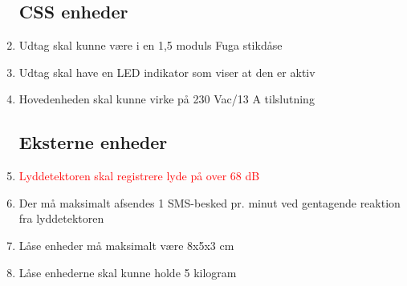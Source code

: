 \begin{enumerate}
	\subsection*{CSS enheder}
	\item Udtag skal kunne være i en 1,5 moduls Fuga stikdåse
	\item Udtag skal have en LED indikator som viser at den er aktiv
	\item Hovedenheden skal kunne virke på 230 Vac/13 A tilslutning

	\subsection*{Eksterne enheder}
	\item \textcolor{red}{Lyddetektoren skal registrere lyde på over 68 dB}
	\item Der må maksimalt afsendes 1 SMS-besked pr. minut ved gentagende reaktion fra lyddetektoren
	\item Låse enheder må maksimalt være 8x5x3 cm
	\item Låse enhederne skal kunne holde 5 kilogram

\end{enumerate}
